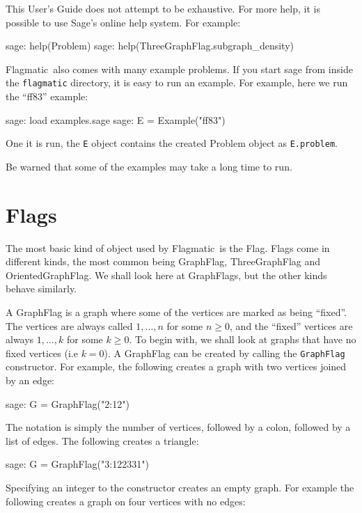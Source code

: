 \documentclass{article}
\providecommand{\flagmatic}{Flagmatic}
\begin{document}
This User's Guide does not attempt to be exhaustive. For more help, it is possible to use Sage's online help system. For example:

\begin{sage}
sage: help(Problem)
sage: help(ThreeGraphFlag.subgraph_density)
\end{sage}

\flagmatic\ also comes with many example problems. If you start sage from inside the \verb|flagmatic| directory, it is easy to run an example. For example, here we run the ``ff83'' example:

\begin{sage}
sage: load examples.sage
sage: E = Example("ff83")
\end{sage}

One it is run, the \verb|E| object contains the created Problem object as \verb|E.problem|.

Be warned that some of the examples may take a long time to run.

\section{Flags}

The most basic kind of object used by \flagmatic\ is the Flag. Flags come in different kinds, the most common being GraphFlag, ThreeGraphFlag and OrientedGraphFlag. We shall look here at GraphFlags, but the other kinds behave similarly.

A GraphFlag is a graph where some of the vertices are marked as being ``fixed''. The vertices are always called $1, \dots, n$ for some $n \ge 0$, and the ``fixed'' vertices are always $1, \dots, k$ for some $k \ge 0$. To begin with, we shall look at graphs that have no fixed vertices (i.{e} $k=0$). A GraphFlag can be created by calling the \verb|GraphFlag| constructor. For example, the following creates a graph with two vertices joined by an edge:

\begin{sage}
sage: G = GraphFlag("2:12")
\end{sage}

The notation is simply the number of vertices, followed by a colon, followed by a list of edges. The following creates a triangle:

\begin{sage}
sage: G = GraphFlag("3:122331")
\end{sage}

Specifying an integer to the constructor creates an empty graph. For example the following 
creates a graph on four vertices with no edges:
\end{document}
